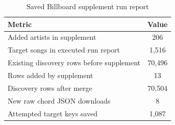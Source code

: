 \begin{table}[H]
\centering
\caption{Saved Billboard supplement run report}
\label{tab:supplement}
\begin{tabular}{lc}
\toprule
Metric & Value \\
\midrule
Added artists in supplement & 206 \\
Target songs in executed run report & 1,516 \\
Existing discovery rows before supplement & 70,496 \\
Rows added by supplement & 13 \\
Discovery rows after merge & 70,504 \\
New raw chord JSON downloads & 8 \\
Attempted target keys saved & 1,087 \\
\bottomrule
\end{tabular}
\end{table}
